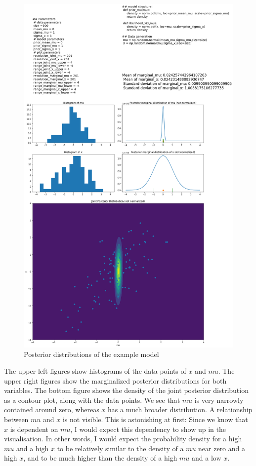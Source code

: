 \documentclass{article}
\begin{document}
\begin{figure}
	\includegraphics[width=\textwidth]{images/ground_truth_posterior_1.png}
	\caption[Posterior distributions of the example model]{Posterior distributions of the example model}
	\label{fig:ground_truth_posterior_1}
\end{figure}
The upper left figures show histograms of the data points of $x$ and $mu$. The upper right figures show the marginalized posterior distributions for both variables. The bottom figure shows the density of the joint posterior distribution as a contour plot, along with the data points. We see that $mu$ is very narrowly contained around zero, whereas $x$ has a much broader distribution. A relationship between $mu$ and $x$ is not visible. This is astonishing at first: Since we know that $x$ is dependent on $mu$, I would expect this dependency to show up in the visualisation. In other words, I would expect the probability density for a high $mu$ and a high $x$ to be relatively similar to the density of a $mu$ near zero and a high $x$, and to be much higher than the density of a high $mu$ and a low $x$.
\end{document}
